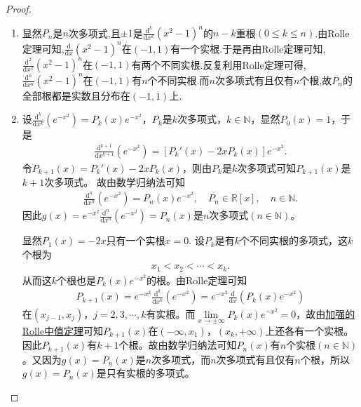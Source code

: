 \documentclass[../../main.tex]{subfiles}%
\begin{document}
\begin{proof}
\begin{enumerate}
\item 显然$P_n$是$n$次多项式,且$\pm 1$是$\frac{\mathrm{d}^k}{\mathrm{d}x^k}(x^2-1)^n$的$n-k$重根$(0\leqslant k\leqslant n)$.由Rolle定理可知,$\frac{\mathrm{d}}{\mathrm{d}x}(x^2-1)^n$在$(-1,1)$有一个实根.于是再由Rolle定理可知,$\frac{\mathrm{d}^2}{\mathrm{d}x^2}(x^2-1)^n$在$(-1,1)$有两个不同实根.反复利用Rolle定理可得,$\frac{\mathrm{d}^n}{\mathrm{d}x^n}(x^2-1)^n$在$(-1,1)$有$n$个不同实根.而$n$次多项式有且仅有$n$个根,故$P_n$的全部根都是实数且分布在$(-1,1)$上.

\item 设$\frac{\mathrm{d}^k}{\mathrm{d}x^k}(e^{-x^2}) = P_k(x)e^{-x^2}$，$P_k$是$k$次多项式，$k\in \mathbb{N}$，显然$P_0(x) = 1$，于是
\begin{align*}
\frac{\mathrm{d}^{k+1}}{\mathrm{d}x^{k+1}}(e^{-x^2}) = \left[ P_k'(x) - 2xP_k(x) \right] e^{-x^2}.
\end{align*}
令$P_{k+1}(x) = P_k'(x) - 2xP_k(x)$，则由$P_k$是$k$次多项式可知$P_{k+1}(x)$是$k+1$次多项式。
故由数学归纳法可知
\begin{align*}
\frac{\mathrm{d}^n}{\mathrm{d}x^n}(e^{-x^2}) = P_n(x)e^{-x^2}, \quad P_n \in \mathbb{R}[x], \quad n \in \mathbb{N}.
\end{align*}
因此$g(x) = e^{-x^2}\frac{\mathrm{d}^n}{\mathrm{d}x^n}(e^{-x^2}) = P_n(x)$是$n$次多项式$(n \in \mathbb{N})$。

显然$P_1(x)=-2x$只有一个实根$x=0$.
设$P_k$是有$k$个不同实根的多项式，这$k$个根为
\begin{align*}
x_1 < x_2 < \cdots < x_k.
\end{align*}
从而这$k$个根也是$P_k(x)e^{-x^2}$的根。由Rolle定理可知
\begin{align*}
P_{k+1}(x) = e^{-x^2}\frac{\mathrm{d}^k}{\mathrm{d}x^k}(e^{-x^2}) = e^{-x^2}\frac{\mathrm{d}}{\mathrm{d}x}\left( P_k(x)e^{-x^2} \right)
\end{align*}
在$(x_{j-1}, x_j)$，$j=2,3,\cdots,k$有实根。而$\lim\limits_{x \rightarrow \pm \infty} P_k(x)e^{-x^2} = 0$，故由\hyperref[theorem:加强的Rolle中值定理]{加强的Rolle中值定理}可知$P_{k+1}(x)$在$(-\infty, x_1)$，$(x_k, +\infty)$上还各有一个实根。因此$P_{k+1}(x)$有$k+1$个根。故由数学归纳法可知$P_n(x)$有$n$个实根$(n \in \mathbb{N})$。又因为$g(x) = P_n(x)$是$n$次多项式，而$n$次多项式有且仅有$n$个根，所以$g(x) = P_n(x)$是只有实根的多项式。
\end{enumerate}

\end{proof}
\end{document}
